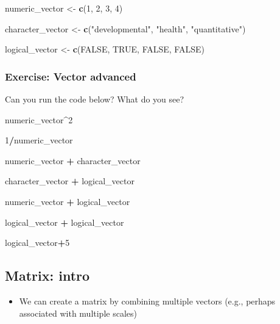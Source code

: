 \documentclass[
]{book}
\newenvironment{Shaded}{\begin{snugshade}}{\end{snugshade}}
\newcommand{\ConstantTok}[1]{\textcolor[rgb]{0.56,0.35,0.01}{#1}}
\newcommand{\DecValTok}[1]{\textcolor[rgb]{0.00,0.00,0.81}{#1}}
\newcommand{\FunctionTok}[1]{\textcolor[rgb]{0.13,0.29,0.53}{\textbf{#1}}}
\newcommand{\NormalTok}[1]{#1}
\newcommand{\OtherTok}[1]{\textcolor[rgb]{0.56,0.35,0.01}{#1}}
\newcommand{\SpecialCharTok}[1]{\textcolor[rgb]{0.81,0.36,0.00}{\textbf{#1}}}
\newcommand{\StringTok}[1]{\textcolor[rgb]{0.31,0.60,0.02}{#1}}
\providecommand{\tightlist}{%
  \setlength{\itemsep}{0pt}\setlength{\parskip}{0pt}}
\begin{document}
\begin{Shaded}
\begin{Highlighting}[]
\NormalTok{numeric\_vector }\OtherTok{\textless{}{-}} \FunctionTok{c}\NormalTok{(}\DecValTok{1}\NormalTok{, }\DecValTok{2}\NormalTok{, }\DecValTok{3}\NormalTok{, }\DecValTok{4}\NormalTok{)}

\NormalTok{character\_vector }\OtherTok{\textless{}{-}} \FunctionTok{c}\NormalTok{(}\StringTok{"developmental"}\NormalTok{, }\StringTok{"health"}\NormalTok{, }\StringTok{"quantitative"}\NormalTok{)}

\NormalTok{logical\_vector }\OtherTok{\textless{}{-}} \FunctionTok{c}\NormalTok{(}\ConstantTok{FALSE}\NormalTok{, }\ConstantTok{TRUE}\NormalTok{, }\ConstantTok{FALSE}\NormalTok{, }\ConstantTok{FALSE}\NormalTok{)}
\end{Highlighting}
\end{Shaded}

\subsubsection{Exercise: Vector advanced}\label{exercise-vector-advanced}

Can you run the code below? What do you see?

\begin{Shaded}
\begin{Highlighting}[]
\NormalTok{numeric\_vector}\SpecialCharTok{\^{}}\DecValTok{2}

\DecValTok{1}\SpecialCharTok{/}\NormalTok{numeric\_vector}

\NormalTok{numeric\_vector }\SpecialCharTok{+}\NormalTok{ character\_vector}

\NormalTok{character\_vector }\SpecialCharTok{+}\NormalTok{ logical\_vector}

\NormalTok{numeric\_vector }\SpecialCharTok{+}\NormalTok{ logical\_vector}

\NormalTok{logical\_vector }\SpecialCharTok{+}\NormalTok{ logical\_vector}

\NormalTok{logical\_vector}\SpecialCharTok{+}\DecValTok{5}
\end{Highlighting}
\end{Shaded}

\subsection{Matrix: intro}\label{matrix-intro}

\begin{itemize}
\tightlist
\item
  We can create a matrix by combining multiple vectors (e.g., perhaps associated with multiple scales)
\end{itemize}
\end{document}
